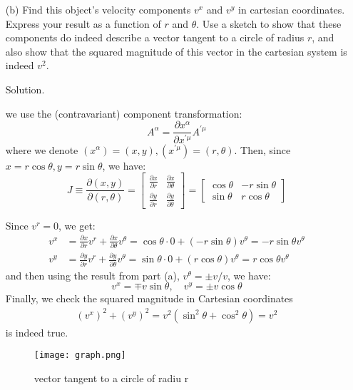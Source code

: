 \documentclass[12pt]{article}
\begin{document}
\begin{enumerate}
    \item[(b)] Find this object's velocity components $v^x$ and $v^y$ in cartesian coordinates. Express your result as a function of $r$ and $\theta$. Use a sketch to show that these components do indeed describe a vector tangent to a circle of radius $r$, and also show that the squared magnitude of this vector in the cartesian system is indeed $v^2$.
    
    \item[Solution.]
    
    
    we use the (contravariant) component transformation:
    $$
    A^\alpha=\frac{\partial x^\alpha}{\partial x^{\prime \mu}} A^{\prime \mu}
    $$
    where we denote $\left(x^\alpha\right)=(x, y),\left(x^{\prime \mu}\right)=(r, \theta)$. Then, since $x=r \cos \theta, y=r \sin \theta$, we have:
    $$
    J \equiv \frac{\partial(x, y)}{\partial(r, \theta)}=\left[\begin{array}{ll}
    \frac{\partial x}{\partial r} & \frac{\partial x}{\partial \theta} \\
    \frac{\partial y}{\partial r} & \frac{\partial y}{\partial \theta}
    \end{array}\right]=\left[\begin{array}{lr}
    \cos \theta & -r \sin \theta \\
    \sin \theta & r \cos \theta
    \end{array}\right]
    $$

    Since $v^r=0$, we get:
    $$
    \begin{aligned}
    v^x&=\frac{\partial x}{\partial r} v^r+\frac{\partial x}{\partial \theta} v^\theta=\cos \theta \cdot 0+(-r \sin \theta) v^\theta=-r \sin \theta v^\theta\\
    v^y&=\frac{\partial y}{\partial r} v^r+\frac{\partial y}{\partial \theta} v^\theta=\sin \theta \cdot 0+(r \cos \theta) v^\theta=r \cos \theta v^\theta
    \end{aligned}
    $$
    and then using the result from part (a), $v^\theta= \pm v / v$, we have:
    $$
    v^x=\mp v \sin \theta, \quad v^y= \pm v \cos \theta
    $$
    Finally, we check the squared magnitude in Cartesian coordinates
    $$
    \begin{aligned}
    \left(v^x\right)^2+\left(v^y\right)^2=v^2\left(\sin ^2 \theta+\cos ^2 \theta\right)=v^2
    \end{aligned}
    $$
    is indeed true.

    \begin{figure}[H]
    \centering
    \texttt{[image: graph.png]}
    \caption{vector tangent to a circle of radiu r}
    \end{figure}



\end{enumerate}
\end{document}
